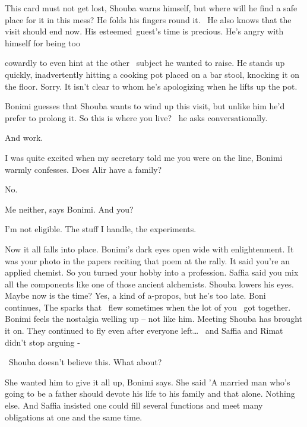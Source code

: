 \documentclass[letterpaper]{article}
\begin{document}
This card must not get lost, Shouba warns himself, but where will he find a safe place for it in this mess? He folds his
fingers round it. \ He also knows that the visit should end now. His esteemed~guest's time is precious.
He's\textcolor[rgb]{0.0,0.4392157,0.7529412}{ }angry with himself for being too 

cowardly to even hint at the other \ subject he wanted to raise. He stands up quickly, inadvertently hitting a cooking
pot placed on a bar stool, knocking it on the floor. {\textquotedbl}Sorry.{\textquotedbl} It isn't clear to whom he's
apologizing when he lifts up the pot.

Bonimi guesses that Shouba wants to wind up this visit, but unlike him he'd prefer to prolong it. {\textquotedbl}So this
is where you live?{\textquotedbl} \ he asks conversationally. 

{\textquotedbl}And work.{\textquotedbl}

{\textquotedbl}I was quite excited when my secretary told me you were on the line,{\textquotedbl} Bonimi warmly
confesses. {\textquotedbl}Does Alir have a family?{\textquotedbl}

{\textquotedbl}No.{\textquotedbl}

{\textquotedbl}Me neither,{\textquotedbl} says Bonimi. {\textquotedbl}And you?{\textquotedbl} 

{\textquotedbl}I'm not eligible. The stuff I handle, the experiments.{\textquotedbl}

{\textquotedbl}Now it all falls into place.{\textquotedbl} Bonimi's dark eyes open wide with enlightenment.
{\textquotedbl}It was your photo in the papers reciting that poem at the rally. It said you're an applied chemist. So
you turned your hobby into a profession. Saffia said you mix all the components like one of those ancient
alchemists.{\textquotedbl} Shouba lowers his eyes. Maybe now is the time? Yes, a kind of a-propos, but he's too late.
Boni continues, {\textquotedbl}The sparks that \ flew sometimes when the lot of you \ got together.{\textquotedbl}
Bonimi feels the nostalgia welling up -- not like him. Meeting Shouba has brought it on. {\textquotedbl}They continued
to fly even after everyone left{\dots} \ and Saffia and Rimat didn't stop arguing -{\textquotedbl}

~Shouba doesn't believe this. {\textquotedbl}What about?{\textquotedbl}

{\textquotedbl}She wanted \textcolor{black}{him} to give it all up,{\textquotedbl} Bonimi says. {\textquotedbl}She said
'A married man who's going to be a father should devote his life to his family and that alone. Nothing else. And Saffia
insisted one could fill several functions and meet many obligations at one and the same time.{\textquotedbl} 
\end{document}
